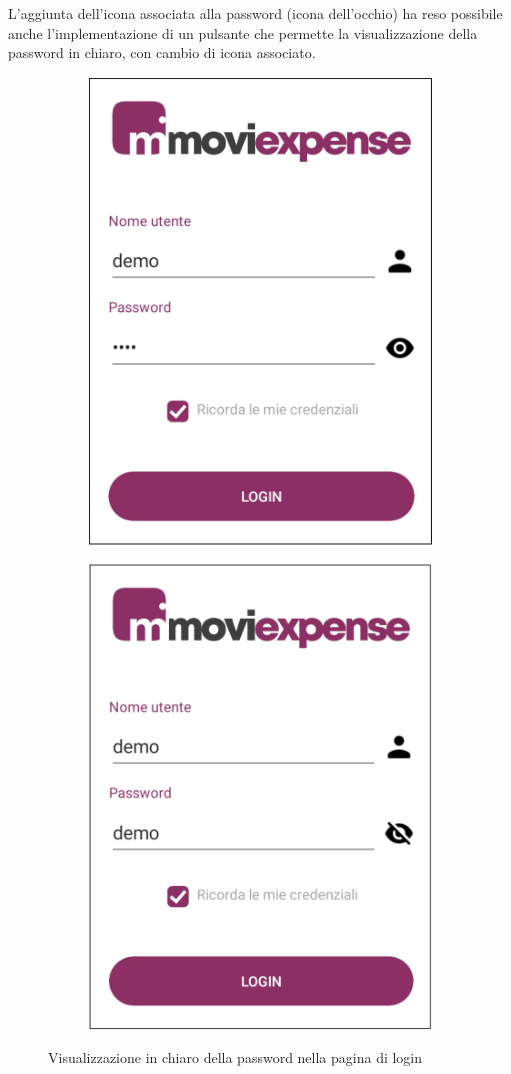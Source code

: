 \noindent L'aggiunta dell'icona associata alla password (icona dell'occhio) ha reso possibile anche l'implementazione di un pulsante che permette la visualizzazione della password in chiaro, con cambio di icona associato.

\begin{figure}[H]
    \begin{subfigure}{.5\textwidth}
        \centering
        \includegraphics[width=.7\columnwidth]{images/screenshot/new/login.png}\vspace{2mm}
    \end{subfigure}
    \begin{subfigure}{.5\textwidth}
        \centering
        \includegraphics[width=.7\columnwidth]{images/screenshot/new/login2.png}\vspace{2mm}
    \end{subfigure}
    \caption{Visualizzazione in chiaro della password nella pagina di login}
\end{figure}
